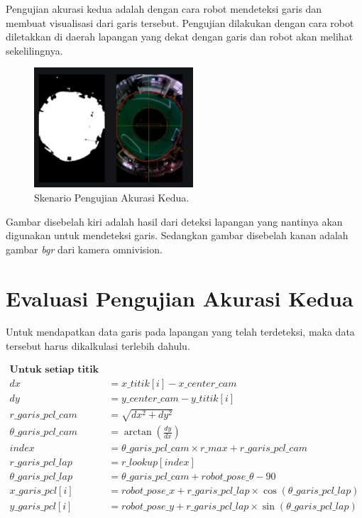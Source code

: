 Pengujian akurasi kedua adalah dengan cara robot mendeteksi garis dan membuat visualisasi dari garis tersebut. Pengujian dilakukan dengan cara robot diletakkan di daerah lapangan yang dekat dengan garis dan robot akan melihat sekelilingnya.  

\begin{figure}[H]
  \centering
  \includegraphics[scale=1.2]{gambar/cam_raw1.jpg}
  \caption{Skenario Pengujian Akurasi Kedua.}
  \label{fig:skenariopengujian}
\end{figure}

Gambar disebelah kiri adalah hasil dari deteksi lapangan yang nantinya akan digunakan untuk mendeteksi garis. Sedangkan gambar disebelah kanan adalah gambar \textit{bgr} dari kamera omnivision. 

\section{Evaluasi Pengujian Akurasi Kedua}
\label{sec:analisispengujian}

Untuk mendapatkan data garis pada lapangan yang telah terdeteksi, maka data tersebut harus dikalkulasi terlebih dahulu. 

\begin{equation}
  \begin{aligned}
    \textbf{Untuk setiap titik pada hasil deteksi garis:} \\
    dx &= x\_titik[i] - x\_center\_cam \\
    dy &= y\_center\_cam - y\_titik[i] \\
    r\_garis\_pcl\_cam &= \sqrt{dx^2 + dy^2} \\
    \theta\_garis\_pcl\_cam &= \arctan(\frac{dy}{dx}) \\
    index &= \theta\_garis\_pcl\_cam \times r\_max + r\_garis\_pcl\_cam \\ 
    r\_garis\_pcl\_lap &= r\_lookup[index] \\
    \theta\_garis\_pcl\_lap &= \theta\_garis\_pcl\_cam + robot\_pose\_\theta - 90 \\
    x\_garis\_pcl[i] &= robot\_pose\_x + r\_garis\_pcl\_lap \times \cos(\theta\_garis\_pcl\_lap) \\
    y\_garis\_pcl[i] &= robot\_pose\_y + r\_garis\_pcl\_lap \times \sin(\theta\_garis\_pcl\_lap) \\
  \end{aligned}
\end{equation}

